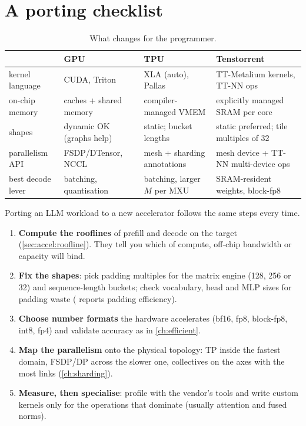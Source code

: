 \section{A porting checklist}\label{sec:accel:checklist}

\begin{table}[t]
\centering\small
\begin{tabularx}{\linewidth}{@{}lXXX@{}}
\toprule
& GPU & TPU & Tenstorrent\\
\midrule
kernel language & CUDA, Triton & XLA (auto), Pallas & TT-Metalium kernels, TT-NN ops\\
on-chip memory & caches + shared memory & compiler-managed VMEM & explicitly managed SRAM per core\\
shapes & dynamic OK (graphs help) & static; bucket lengths & static preferred; tile multiples of 32\\
parallelism API & FSDP/DTensor, NCCL & mesh + sharding annotations & mesh device + TT-NN multi-device ops\\
best decode lever & batching, quantisation & batching, larger $M$ per MXU & SRAM-resident weights, block-fp8\\
\bottomrule
\end{tabularx}
\caption{What changes for the programmer.}
\label{tab:accel:port}
\end{table}

Porting an LLM workload to a new accelerator follows the same steps every time.
\begin{enumerate}
  \item \textbf{Compute the rooflines} of prefill and decode on the target (\cref{sec:accel:roofline}).
    They tell you which of compute, off-chip bandwidth or capacity will bind.
  \item \textbf{Fix the shapes}: pick padding multiples for the matrix engine (128, 256 or 32) and
    sequence-length buckets; check vocabulary, head and MLP sizes for padding waste
    ( reports padding efficiency).
  \item \textbf{Choose number formats} the hardware accelerates (bf16, fp8, block-fp8, int8, fp4)
    and validate accuracy as in \cref{ch:efficient}.
  \item \textbf{Map the parallelism} onto the physical topology: TP inside the fastest domain,
    FSDP/DP across the slower one, collectives on the axes with the most links
    (\cref{ch:sharding}).
  \item \textbf{Measure, then specialise}: profile with the vendor's tools and write custom kernels
    only for the operations that dominate (usually attention and fused norms).
\end{enumerate}

